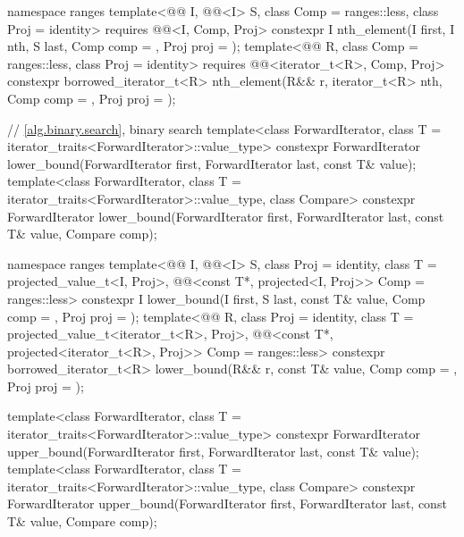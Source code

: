 \begin{codeblock}
{  namespace ranges {
    template<@@ I, @@<I> S, class Comp = ranges::less,
             class Proj = identity>
      requires @@<I, Comp, Proj>
      constexpr I
        nth_element(I first, I nth, S last, Comp comp = {}, Proj proj = {});
    template<@@ R, class Comp = ranges::less, class Proj = identity>
      requires @@<iterator_t<R>, Comp, Proj>
      constexpr borrowed_iterator_t<R>
        nth_element(R&& r, iterator_t<R> nth, Comp comp = {}, Proj proj = {});
  }

  // \ref{alg.binary.search}, binary search
  template<class ForwardIterator, class T = iterator_traits<ForwardIterator>::value_type>
    constexpr ForwardIterator
      lower_bound(ForwardIterator first, ForwardIterator last,
                  const T& value);
  template<class ForwardIterator, class T = iterator_traits<ForwardIterator>::value_type,
           class Compare>
    constexpr ForwardIterator
      lower_bound(ForwardIterator first, ForwardIterator last,
                  const T& value, Compare comp);

  namespace ranges {
    template<@@ I, @@<I> S, class Proj = identity,
             class T = projected_value_t<I, Proj>,
             @@<const T*, projected<I, Proj>> Comp = ranges::less>
      constexpr I lower_bound(I first, S last, const T& value, Comp comp = {},
                              Proj proj = {});
    template<@@ R, class Proj = identity,
             class T = projected_value_t<iterator_t<R>, Proj>,
             @@<const T*, projected<iterator_t<R>, Proj>> Comp =
               ranges::less>
      constexpr borrowed_iterator_t<R>
        lower_bound(R&& r, const T& value, Comp comp = {}, Proj proj = {});
  }

  template<class ForwardIterator, class T = iterator_traits<ForwardIterator>::value_type>
    constexpr ForwardIterator
      upper_bound(ForwardIterator first, ForwardIterator last,
                  const T& value);
  template<class ForwardIterator, class T = iterator_traits<ForwardIterator>::value_type,
           class Compare>
    constexpr ForwardIterator
      upper_bound(ForwardIterator first, ForwardIterator last,
                  const T& value, Compare comp);

}
\end{codeblock}
